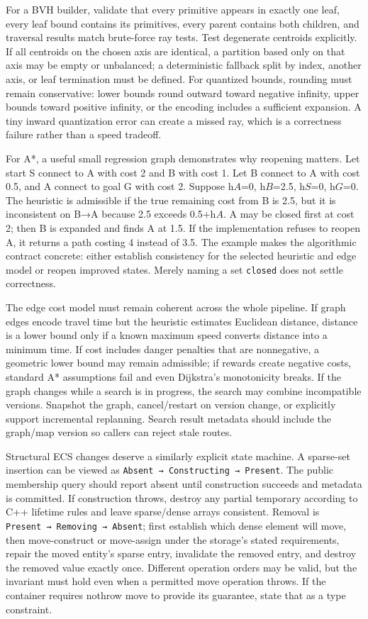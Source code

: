 For a BVH builder, validate that every primitive appears in exactly one leaf, every leaf bound contains its primitives, every parent contains both children, and traversal results match brute-force ray tests. Test degenerate centroids explicitly. If all centroids on the chosen axis are identical, a partition based only on that axis may be empty or unbalanced; a deterministic fallback split by index, another axis, or leaf termination must be defined. For quantized bounds, rounding must remain conservative: lower bounds round outward toward negative infinity, upper bounds toward positive infinity, or the encoding includes a sufficient expansion. A tiny inward quantization error can create a missed ray, which is a correctness failure rather than a speed tradeoff.

For A*, a useful small regression graph demonstrates why reopening matters. Let start S connect to A with cost 2 and B with cost 1. Let B connect to A with cost 0.5, and A connect to goal G with cost 2. Suppose h\(A\)=0, h\(B\)=2.5, h\(S\)=0, h\(G\)=0. The heuristic is admissible if the true remaining cost from B is 2.5, but it is inconsistent on B→A because 2.5 exceeds 0.5+h\(A\). A may be closed first at cost 2; then B is expanded and finds A at 1.5. If the implementation refuses to reopen A, it returns a path costing 4 instead of 3.5. The example makes the algorithmic contract concrete: either establish consistency for the selected heuristic and edge model or reopen improved states. Merely naming a set \texttt{closed} does not settle correctness.

The edge cost model must remain coherent across the whole pipeline. If graph edges encode travel time but the heuristic estimates Euclidean distance, distance is a lower bound only if a known maximum speed converts distance into a minimum time. If cost includes danger penalties that are nonnegative, a geometric lower bound may remain admissible; if rewards create negative costs, standard A* assumptions fail and even Dijkstra's monotonicity breaks. If the graph changes while a search is in progress, the search may combine incompatible versions. Snapshot the graph, cancel/restart on version change, or explicitly support incremental replanning. Search result metadata should include the graph/map version so callers can reject stale routes.

Structural ECS changes deserve a similarly explicit state machine. A sparse-set insertion can be viewed as \texttt{Absent\ →\ Constructing\ →\ Present}. The public membership query should report absent until construction succeeds and metadata is committed. If construction throws, destroy any partial temporary according to C++ lifetime rules and leave sparse/dense arrays consistent. Removal is \texttt{Present\ →\ Removing\ →\ Absent}; first establish which dense element will move, then move-construct or move-assign under the storage's stated requirements, repair the moved entity's sparse entry, invalidate the removed entry, and destroy the removed value exactly once. Different operation orders may be valid, but the invariant must hold even when a permitted move operation throws. If the container requires nothrow move to provide its guarantee, state that as a type constraint.

